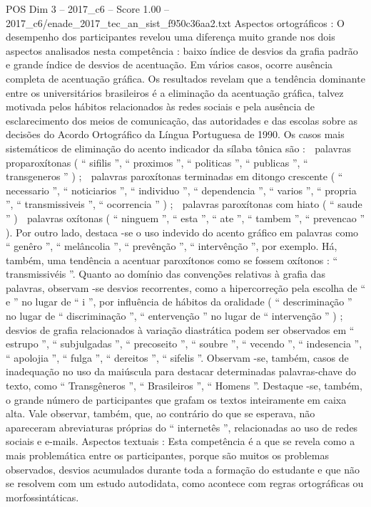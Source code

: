 \begin{textsample}{POS Dim 3 – 2017\_c6 – Score 1.00 – 2017\_c6/enade\_2017\_tec\_an\_sist\_f950c36aa2.txt}
Aspectos ortográficos : O desempenho dos participantes revelou uma diferença muito grande nos dois aspectos analisados nesta competência : baixo índice de desvios da grafia padrão e grande índice de desvios de acentuação.
Em vários casos, ocorre ausência completa de acentuação gráfica.
Os resultados revelam que a tendência dominante entre os universitários brasileiros é a eliminação da acentuação gráfica, talvez motivada pelos hábitos relacionados às redes sociais e pela ausência de esclarecimento dos meios de comunicação, das autoridades e das escolas sobre as decisões do Acordo Ortográfico da Língua Portuguesa de 1990.
Os casos mais sistemáticos de eliminação do acento indicador da sílaba tônica são :  palavras proparoxítonas ( “ sifilis ”, “ proximos ”, “ politicas ”, “ publicas ”, “ transgeneros ” ) ;  palavras paroxítonas terminadas em ditongo crescente ( “ necessario ”, “ noticiarios ”, “ individuo ”, “ dependencia ”, “ varios ”, “ propria ”, “ transmissiveis ”, “ ocorrencia ” ) ;  palavras paroxítonas com hiato ( “ saude ” )  palavras oxítonas ( “ ninguem ”, “ esta ”, “ ate ”, “ tambem ”, “ prevencao ” ).
Por outro lado, destaca -se o uso indevido do acento gráfico em palavras como “ genêro ”, “ melâncolia ”, “ prevênção ”, “ intervênção ”, por exemplo.
Há, também, uma tendência a acentuar paroxítonos como se fossem oxítonos : “ transmissivéis ”.
Quanto ao domínio das convenções relativas à grafia das palavras, observam -se desvios recorrentes, como a hipercorreção pela escolha de “ e ” no lugar de “ i ”, por influência de hábitos da oralidade ( “ descriminação ” no lugar de “ discriminação ”, “ entervenção ” no lugar de “ intervenção ” ) ; desvios de grafia relacionados à variação diastrática podem ser observados em “ estrupo ”, “ subjulgadas ”, “ precoseito ”, “ soubre ”, “ vecendo ”, “ indesencia ”, “ apolojia ”, “ fulga ”, “ dereitos ”, “ sifelis ”.
Observam -se, também, casos de inadequação no uso da maiúscula para destacar determinadas palavras-chave do texto, como “ Transgêneros ”, “ Brasileiros ”, “ Homens ”.
Destaque -se, também, o grande número de participantes que grafam os textos inteiramente em caixa alta.
Vale observar, também, que, ao contrário do que se esperava, não apareceram abreviaturas próprias do “ internetês ”, relacionadas ao uso de redes sociais e e-mails.
Aspectos textuais : Esta competência é a que se revela como a mais problemática entre os participantes, porque são muitos os problemas observados, desvios acumulados durante toda a formação do estudante e que não se resolvem com um estudo autodidata, como acontece com regras ortográficas ou morfossintáticas.

\end{textsample}
